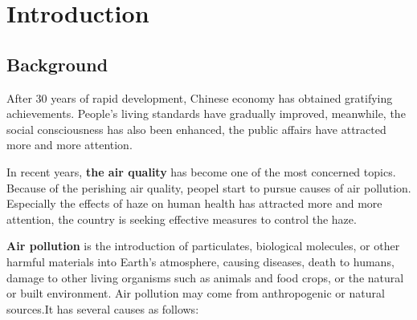 \documentclass[a4paper,11pt]{article}
\begin{document}
\newpage%
\thispagestyle{empty}%
\tableofcontents%
\thispagestyle{empty}
\newpage%

\section{Introduction}

\subsection{Background}
\par After 30 years of rapid development, Chinese economy has obtained gratifying achievements. People's living standards have gradually  improved, meanwhile, the social consciousness has also been enhanced, the public affairs have attracted more and more attention.
\par In recent years, \textbf{the air quality} has become one of the most concerned topics. Because of the perishing air quality, peopel start to pursue causes of air pollution. Especially the effects of haze on human health has attracted more and more attention, the country is seeking effective measures to control the haze.
\par \textbf{Air pollution} is the introduction of particulates, biological molecules, or other harmful materials into Earth's atmosphere, causing diseases, death to humans, damage to other living organisms such as animals and food crops, or the natural or built environment. Air pollution may come from anthropogenic or natural sources.It has several causes as follows:
\end{document}
